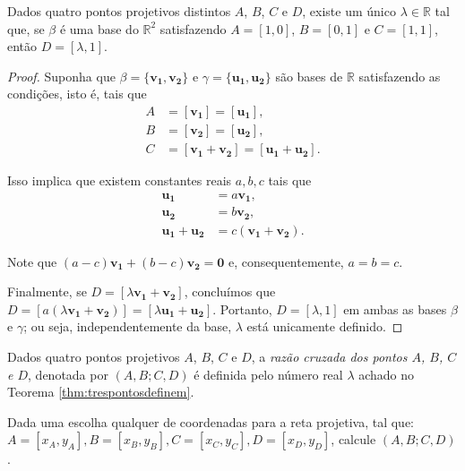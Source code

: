\begin{thm}\label{thm:trespontosdefinem}
  Dados quatro pontos projetivos distintos \(A\), \(B\), \(C\) e \(D\), existe um único \(\lambda \in \mathbb{R}\) tal que, se \(\beta\) é uma base do \(\mathbb{R}^2\) satisfazendo \(A = [1, 0]\), \(B = [0, 1]\) e \(C = [1, 1]\), então \(D = [\lambda, 1]\).
\end{thm}
\begin{proof}
  Suponha que \(\beta = \{\mathbf{v_1}, \mathbf{v_2}\}\) e \(\gamma = \{\mathbf{u_1}, \mathbf{u_2}\}\) são bases de \(\mathbb{R}\) satisfazendo as condições, isto é, tais que
  \begin{align*}
    A &= [\mathbf{v_1}] = [\mathbf{u_1}], \\
    B &= [\mathbf{v_2}] = [\mathbf{u_2}], \\
    C &= [\mathbf{v_1} + \mathbf{v_2}] = [\mathbf{u_1} + \mathbf{u_2}].
  \end{align*}

  Isso implica que existem constantes reais \(a, b, c\) tais que
  \begin{align*}
    \mathbf{u_1} &= a \mathbf{v_1}, \\
    \mathbf{u_2} &= b \mathbf{v_2}, \\
    \mathbf{u_1} + \mathbf{u_2} &= c \left(\mathbf{v_1} + \mathbf{v_2}\right).
  \end{align*}

  Note que \((a - c)\mathbf{v_1} + (b - c)\mathbf{v_2} = \mathbf{0}\) e, consequentemente, \(a = b = c\).

  Finalmente, se \(D = [\lambda\mathbf{v_1} + \mathbf{v_2}]\), concluímos que \(D = [a\left(\lambda\mathbf{v_1} + \mathbf{v_2}\right)] = [\lambda\mathbf{u_1} + \mathbf{u_2}]\). Portanto, \(D = [\lambda, 1]\) em ambas as bases \(\beta\) e \(\gamma\); ou seja, independentemente da base, \(\lambda\) está unicamente definido.
\end{proof}

\begin{defn}\label{defn:razaocruzada}
  Dados quatro pontos projetivos \(A\), \(B\), \(C\) e \(D\), a \emph{razão cruzada dos pontos \(A\), \(B\), \(C\) e \(D\)}, denotada por \((A, B; C, D)\) é definida pelo número real \(\lambda\) achado no Teorema \ref{thm:trespontosdefinem}.
\end{defn}

\begin{exmp}
Dada uma escolha qualquer de coordenadas para a reta projetiva, tal que: $A = [x_A,y_A],B = [x_B,y_B],C = [x_C,y_C],D = [x_D,y_D]$, calcule $(A,B;C,D)$.
\end{exmp}

